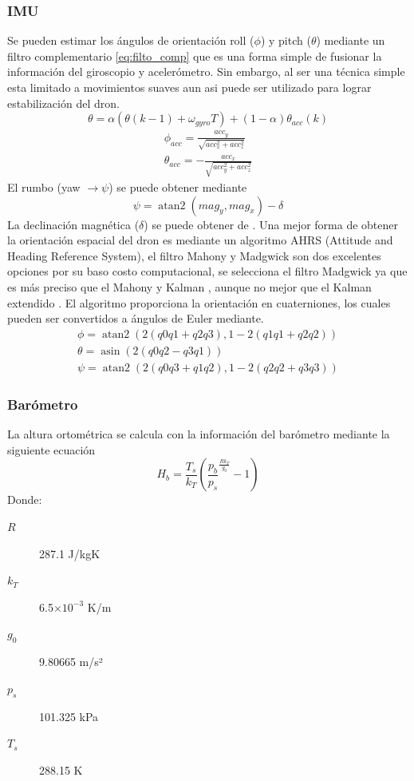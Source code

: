 \subsubsection{IMU}
Se pueden estimar los ángulos de orientación roll ($\phi$) y pitch ($\theta$) mediante un filtro complementario \eqref{eq:filto_comp} que es una forma simple de fusionar la información del
giroscopio y acelerómetro. Sin embargo, al ser una técnica simple esta limitado a movimientos suaves aun asi puede ser utilizado para lograr estabilización del dron.
\begin{equation}
	\label{eq:filto_comp}
	\theta = \alpha(\theta(k-1) + \omega_{gyro}T) + (1-\alpha)\theta_{acc}(k)
\end{equation}
\begin{gather}
	\phi_{acc} = \frac{acc_y}{\sqrt{acc_x^2 + acc_z^2}}\\
	\theta_{acc} = -\frac{acc_x}{\sqrt{acc_y^2+ acc_z^2}}
\end{gather}
El rumbo (yaw $\rightarrow \psi$) se puede obtener mediante
\begin{equation}
	\psi = \operatorname{atan2}(mag_y,mag_x) - \delta
\end{equation}
La declinación magnética ($\delta$) se puede obtener de \cite{centerNCEI}.
Una mejor forma de obtener la orientación espacial del dron es mediante un algoritmo AHRS (Attitude and Heading Reference System), el filtro Mahony y Madgwick son dos excelentes opciones por su
baso costo computacional, se selecciona el filtro Madgwick ya que es más preciso que el Mahony y Kalman \cite{madgwickEstimation2011a}, aunque no mejor que el Kalman extendido \cite{cavalloExperimental2014}.
El algoritmo proporciona la orientación en cuaterniones, los cuales pueden ser convertidos a ángulos de Euler mediante.
\begin{gather}
	\phi = \operatorname{atan2}(2(q0q1+q2q3), 1-2(q1q1+q2q2))\\
	\theta = \operatorname{asin}(2(q0q2-q3q1))\\
	\psi = \operatorname{atan2}(2(q0q3+q1q2), 1-2(q2q2+q3q3))
\end{gather}
\subsubsection{Barómetro}
La altura ortométrica \cite{grovesBarometric2013} se calcula con la información del barómetro mediante la siguiente ecuación
\begin{equation}
	\label{eq:baro}
	H_b = \frac{T_s}{k_T}\left(\frac{p_b}{p_s}^\frac{Rk_T}{g_0} -1\right)
\end{equation}
Donde:
\begin{description}
	\item[$R$] 287.1 J/kgK
	\item[$k_T$] 6.5$\times10^{-3}$ K/m
	\item[$g_0$] 9.80665 m/s²
	\item[$p_s$] 101.325 kPa
	\item[$T_s$] 288.15 K
\end{description}